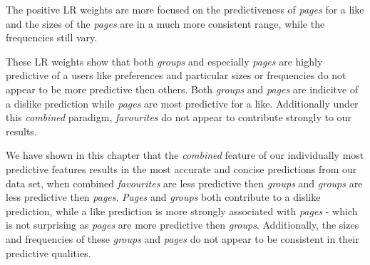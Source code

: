 The positive LR weights are more focused on the predictiveness of \emph{pages} for a like and the sizes of the \emph{pages} are in
a much more consistent range, while the frequencies still vary.

These LR weights show that both \emph{groups} and especially \emph{pages} are highly predictive of a users like preferences and particular 
sizes or frequencies do not appear to be more predictive then others. Both \emph{groups} and \emph{pages} are indicitve of a dislike prediction 
while \emph{pages} are most predictive for a like. Additionally under this \emph{combined} paradigm, \emph{favourites} do not appear 
to contribute strongly to our results.

We have shown in this chapter that the \emph{combined} feature of our individually most predictive features results in the most 
accurate and concise predictions from our data set, when combined \emph{favourites} are less predictive then \emph{groups} and 
\emph{groups} are less predictive then \emph{pages}. \emph{Pages} and \emph{groups} both contribute to a dislike prediction, while a like
prediction is more strongly associated with \emph{pages} - which is not surprising as \emph{pages} are more predictive then \emph{groups}.
Additionally, the sizes and frequencies of these \emph{groups} and \emph{pages} do not appear to be consistent in their predictive qualities.

